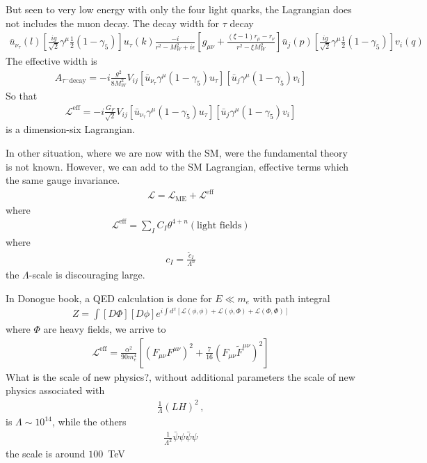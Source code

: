 \documentclass[12pt,letterpaper]{article}
\begin{document}
But seen to very low energy with only the four light quarks, the Lagrangian does not includes the muon decay. The decay width for $\tau$ decay
\begin{align*}
  \bar{u}_{\nu_{\tau}}(l)\left[ \frac{ig}{\sqrt{2}}\gamma^{\mu}\frac{1}{2}(1-\gamma_5) \right]u_{\tau}(k)\frac{-i}{r^2-M_W^2+i\epsilon}\left[ g_{\mu\nu}+
\frac{(\xi-1)r_{\mu}-r_{\nu}}{r^2-\xi M_W^2} \right]
\bar{u}_j(p)\left[ \frac{ig}{\sqrt{2}}\gamma^{\mu}\frac{1}{2}(1-\gamma_5) \right]v_i(q)
\end{align*}
The effective width is
\begin{align*}
  A_{\tau^{-}\text{decay}}=-i
\frac{g^2}{8M_W^{2}}V_{ij}
\left[\bar{u}_{\nu_{\tau}}\gamma^{\mu}(1-\gamma_5)u_{\tau}  \right]
\left[\bar{u}_j\gamma^{\mu}(1-\gamma_5) v_i  \right]
\end{align*}
So that
\begin{align*}
  \mathcal{L}^{\text{eff}}=-i\frac{G_F}{\sqrt{2}}V_{ij}
\left[\bar{u}_{\nu_{\tau}}\gamma^{\mu}(1-\gamma_5)u_{\tau}  \right]
\left[\bar{u}_j\gamma^{\mu}(1-\gamma_5) v_i  \right]
\end{align*}
is a dimension-six Lagrangian. 

In other situation, where we are now with the SM, were the fundamental
theory is not known. However, we can add to the SM Lagrangian,
effective terms which the same gauge invariance.
\begin{align*}
  \mathcal{L}=\mathcal{L}_{\text{ME}}+\mathcal{L}^{\text{eff}}
\end{align*}
where
\begin{align*}
  \mathcal{L}^{\text{eff}}=\sum_I C_I \theta^{4+n}(\text{light fields})
\end{align*}
where
\begin{align*}
  c_I=\frac{\tilde{c}_I}{\Lambda^n}
\end{align*}
the $\Lambda$-scale is discouraging large.

In Donogue book, a QED calculation is done for $E\ll m_e$ with path integral
\begin{align*}
  Z=\int \left[ D\Phi \right]\left[ D\phi \right]
e^{i\int d^{x}\left[\mathcal{L}(\phi,\phi)+\mathcal{L}(\phi,\Phi)+\mathcal{L}(\Phi,\Phi)  \right]}
\end{align*}
where $\Phi$ are heavy fields, we arrive to
\begin{align*}
  \mathcal{L}^{\text{eff}}=\frac{\alpha^{2}}{90m_e^4}\left[ \left( F_{\mu\nu}F^{\mu\nu} \right)^2
+\frac{7}{16}\left( F_{\mu\nu}\widetilde{F}^{\mu\nu} \right)^2 \right]
\end{align*}
What is the scale of new physics?, without additional parameters the scale of new physics associated with
\begin{align*}
  \frac{1}{\Lambda}(LH)^2\,,
\end{align*}
is $\Lambda\sim 10^{14}$, while the others
\begin{align*}
  \frac{1}{\Lambda^2}\bar{\psi}\psi\bar{\psi}\psi
\end{align*}
the scale is around $100$~TeV
\end{document}
